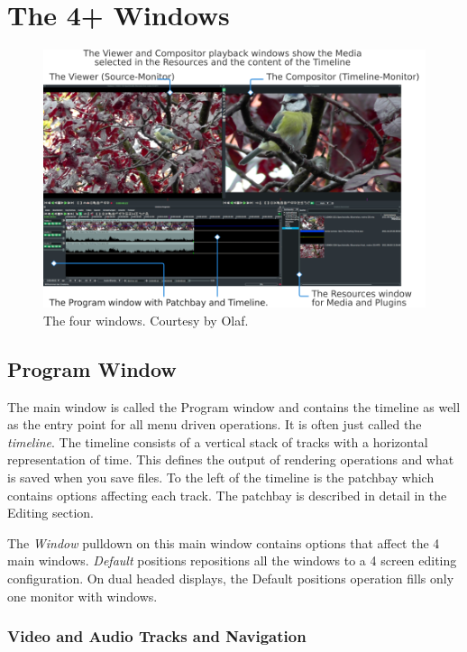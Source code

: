 \chapter{The 4+ Windows}%
\label{cha:the_4_windows}

\begin{figure}[htpb]
    \centering
    \includegraphics[width=0.9\linewidth]{images/Rastergrafik.png}
    \caption{The four windows. Courtesy by Olaf.}
    \label{fig:Rastergrafik}
\end{figure}

\section{Program Window}%
\label{sec:program_window}

The main window is called the Program window and contains the timeline as well as the entry point for all menu driven operations.  
It is often just called the \textit{timeline}.  
The timeline consists of a vertical stack of tracks with a horizontal representation of time. 
This defines the output of rendering operations and what is saved when you save files. 
To the left of the timeline is the patchbay which contains options affecting each track.  
The patchbay is described in detail in the Editing section.

The \emph{Window} pulldown on this main window contains options that affect the 4 main windows. 
\emph{Default} positions repositions all the windows to a 4 screen editing configuration.
On dual headed displays,
the Default positions operation fills only one monitor with windows.

\subsection{Video and Audio Tracks and Navigation}%
\label{sub:video_and_audio_tracks_and_navigation}

